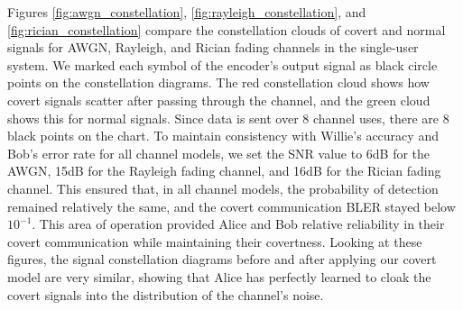 Figures \ref{fig:awgn_constellation}, \ref{fig:rayleigh_constellation}, and \ref{fig:rician_constellation} compare the constellation clouds of covert and normal signals for AWGN, Rayleigh, and Rician fading channels in the single-user system. We marked each symbol of the encoder's output signal as black circle points on the constellation diagrams. The red constellation cloud shows how covert signals scatter after passing through the channel, and the green cloud shows this for normal signals. Since data is sent over 8 channel uses, there are 8 black points on the chart. To maintain consistency with Willie's accuracy and Bob's error rate for all channel models, we set the SNR value to 6dB for the AWGN, 15dB for the Rayleigh fading channel, and 16dB for the Rician fading channel. This ensured that, in all channel models, the probability of detection remained relatively the same, and the covert communication BLER stayed below \(10^{-1}\). This area of operation provided Alice and Bob relative reliability in their covert communication while maintaining their covertness.
Looking at these figures, the signal constellation diagrams before and after applying our covert model are very similar, showing that Alice has perfectly learned to cloak the covert signals into the distribution of the channel's noise.
